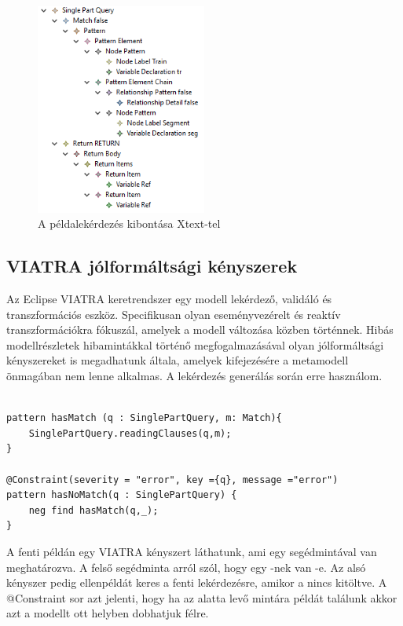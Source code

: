 \begin{figure}
	\centering
	\includegraphics[width=0.5\textwidth]{figures/Xtextelkibontotthellowolrd}
	\caption{A példalekérdezés kibontása Xtext-tel}
	\label{fig:Xtexttelkibontotthelloworld}
\end{figure}


\subsection{\textsc{VIATRA} jólformáltsági kényszerek}
Az Eclipse  \textsc{VIATRA} keretrendszer \cite{viatra} egy modell lekérdező, validáló és transzformációs eszköz. Specifikusan olyan eseményvezérelt
és reaktív transzformációkra fókuszál, amelyek a modell változása közben történnek.  Hibás modellrészletek hibamintákkal történő megfogalmazásával olyan jólformáltsági kényszereket is megadhatunk általa, amelyek kifejezésére a metamodell önmagában nem lenne alkalmas. A lekérdezés generálás során erre használom.


\begin{lstlisting}[style=viatrasmall]

pattern hasMatch (q : SinglePartQuery, m: Match){
	SinglePartQuery.readingClauses(q,m);
}

@Constraint(severity = "error", key ={q}, message ="error")
pattern hasNoMatch(q : SinglePartQuery) {
    neg find hasMatch(q,_);
}

\end{lstlisting} 


A fenti példán egy  \textsc{VIATRA} kényszert láthatunk, ami egy segédmintával van meghatározva. A felső segédminta arról szól, hogy egy  -nek van -e. Az alsó kényszer pedig ellenpéldát keres a fenti lekérdezésre, amikor a  nincs kitöltve. A @Constraint sor azt jelenti, hogy ha az alatta levő mintára példát találunk akkor azt a modellt ott helyben dobhatjuk félre.  

